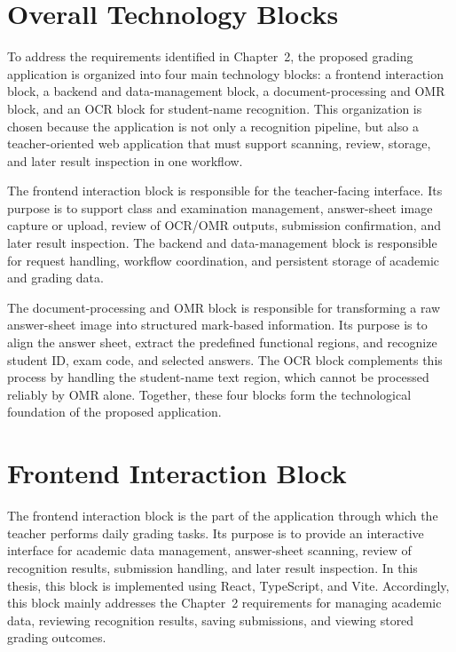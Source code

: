 \documentclass[../Main.tex]{subfiles}
\begin{document}
\section{Overall Technology Blocks}
\label{section:3.1}

To address the requirements identified in Chapter~2, the proposed grading
application is organized into four main technology blocks: a frontend
interaction block, a backend and data-management block, a document-processing
and OMR block, and an OCR block for student-name recognition. This organization
is chosen because the application is not only a recognition pipeline, but also a
teacher-oriented web application that must support scanning, review, storage,
and later result inspection in one workflow.

The frontend interaction block is responsible for the teacher-facing interface.
Its purpose is to support class and examination management, answer-sheet image
capture or upload, review of OCR/OMR outputs, submission confirmation, and
later result inspection. The backend and data-management block is responsible
for request handling, workflow coordination, and persistent storage of academic
and grading data.

The document-processing and OMR block is responsible for transforming a raw
answer-sheet image into structured mark-based information. Its purpose is to
align the answer sheet, extract the predefined functional regions, and recognize
student ID, exam code, and selected answers. The OCR block complements this
process by handling the student-name text region, which cannot be processed
reliably by OMR alone. Together, these four blocks form the technological
foundation of the proposed application.

\section{Frontend Interaction Block}
\label{section:3.2}

The frontend interaction block is the part of the application through which the
teacher performs daily grading tasks. Its purpose is to provide an interactive
interface for academic data management, answer-sheet scanning, review of
recognition results, submission handling, and later result inspection. In this
thesis, this block is implemented using React, TypeScript, and Vite.
Accordingly, this block mainly addresses the Chapter~2 requirements for
managing academic data, reviewing recognition results, saving submissions, and
viewing stored grading outcomes.
\end{document}
